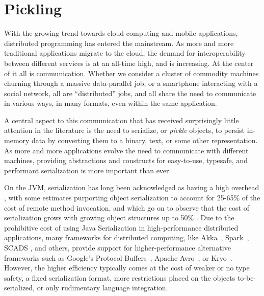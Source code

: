 \chapter{Pickling}

With the growing trend towards cloud computing and mobile applications,
distributed programming has entered the mainstream. As more and more
traditional applications migrate to the cloud, the demand for interoperability between
different services is at an all-time high, and is increasing. At the center of
it all is communication. Whether we consider a cluster of commodity machines
churning through a massive data-parallel job, or a smartphone interacting with
a social network, all are ``distributed'' jobs, and all share the need to
communicate in various ways, in many formats, even within the same
application.

A central aspect to this communication that has received surprisingly little
attention in the literature is the need to serialize, or {\em pickle} objects,
\ie to persist in-memory data by converting them to a binary, text, or
some other representation.
As more and more applications evolve the need to communicate with different machines, providing abstractions and constructs for easy-to-use, typesafe, and performant serialization is more important than ever.

On the JVM, serialization has long been
acknowledged as having a high overhead \cite{Welsh2000, Carpenter1999}, with
some estimates purporting object serialization to account for 25-65\% of the
cost of remote method invocation, and which go on to observe that the cost of
serialization grows with growing object structures up to 50\%
\cite{Philippsen2000, Maassen1999}.
Due to the prohibitive cost of using Java Serialization in high-performance
distributed applications, many frameworks for distributed computing, like
Akka~\cite{Akka}, Spark~\cite{Zaharia2012}, SCADS \cite{Armbrust2009}, and
others, provide support for higher-performance alternative frameworks such as
Google's Protocol Buffers~\cite{Protobuf}, Apache Avro~\cite{Avro}, or
Kryo~\cite{Kryo}. However, the higher efficiency typically comes at the cost
of weaker or no type safety, a fixed serialization format, more restrictions
placed on the objects to-be-serialized, or only rudimentary language
integration.

